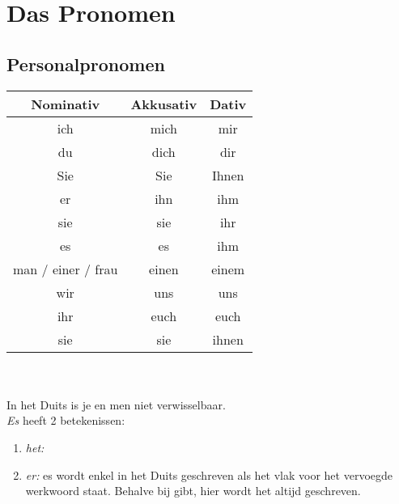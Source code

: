 \documentclass[main.tex]{subfiles}
\begin{document}
\chapter{Das Pronomen}
\section{Personalpronomen}
\begin{tabular}{|c|c|c|}
\rowcolor{gray}
\setlength\extrarowheight{8pt}
Nominativ & Akkusativ & Dativ \\
\hline 
ich & mich & mir \\ 
du & dich & dir \\ 
Sie & Sie & Ihnen \\ 
er & ihn & ihm \\ 
sie & sie & ihr \\ 
es & es & ihm \\ 
man / einer / frau & einen & einem\\
wir & uns & uns \\ 
ihr & euch & euch \\ 
sie & sie & ihnen \\ 
\hline
\end{tabular} \\
\\
In het Duits is je en men niet verwisselbaar.\\
\textit{Es} heeft 2 betekenissen:
\begin{enumerate}
\item \textit{het:} 
\item \textit{er:} es wordt enkel in het Duits geschreven als het vlak voor het vervoegde werkwoord staat. Behalve bij gibt, hier wordt het altijd geschreven.
\end{enumerate}

\end{document}
